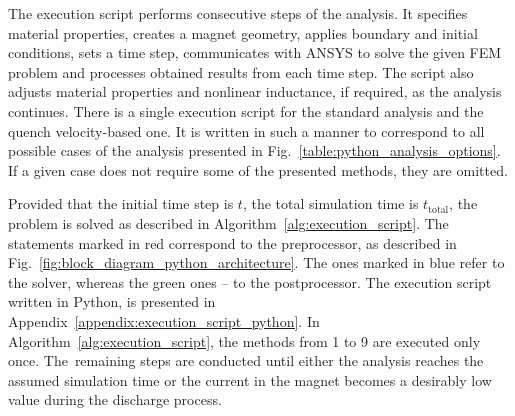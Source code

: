 
The execution script performs consecutive steps of the analysis. It specifies material properties, creates a magnet geometry, applies boundary and initial conditions, sets a time step, communicates with ANSYS to solve the given FEM problem and processes obtained results from each time step. The script also adjusts material properties and nonlinear inductance, if required, as the analysis continues. There is a single execution script for the standard analysis and the quench velocity-based one. It is written in such a manner to correspond to all possible cases of the analysis presented in Fig.~\ref{table:python_analysis_options}. If a given case does not require some of the presented methods, they are omitted. 

Provided that the initial time step is $t$, the total simulation time is $t_\text{total}$, the problem is solved as described in Algorithm~\ref{alg:execution_script}. The statements marked in red correspond to the preprocessor, as described in Fig.~\ref{fig:block_diagram_python_architecture}. The ones marked in blue refer to the solver, whereas the green ones -- to the postprocessor. The execution script written in Python, is presented in Appendix~\ref{appendix:execution_script_python}. In Algorithm~\ref{alg:execution_script}, the methods from 1 to 9 are executed only once. The~remaining steps are conducted until either the analysis reaches the assumed simulation time or the current in the magnet becomes a desirably low value during the discharge process. 

